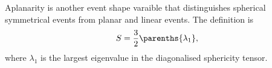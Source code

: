 Aplanarity is another event shape varaible that distinguishes spherical symmetrical events from planar and linear events. The definition is
\begin{equation}
S = \frac{3}{2}\parenths{\lambda_{1}},
\end{equation}
where $\lambda_{1}$ is the largest eigenvalue in the diagonalised sphericity tensor.


